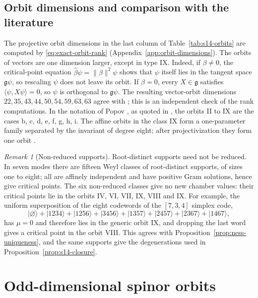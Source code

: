\documentclass{article}
\theoremstyle{definition}
\theoremstyle{remark}
\newtheorem{remark}[theorem]{Remark}
\newcommand{\ket}[1]{\lvert #1\rangle}
\newcommand{\norm}[1]{\lVert #1\rVert}
\begin{document}
\subsection{Orbit dimensions and comparison with the literature}
\label{sec:popov-comparison-integrated}

The projective orbit dimensions in the last column of
Table~\ref{tab:s14-orbits} are computed by \eqref{eq:exact-orbit-rank}
(Appendix~\ref{app:orbit-dimensions}). The orbits of vectors are one dimension
larger, except in type IX. Indeed, if $\beta\ne0$, the critical-point equation
$\widehat\beta\psi=\norm\beta^2\psi$ shows that $\psi$ itself lies in the
tangent space $\mathfrak g\psi$, so rescaling $\psi$ does not leave its orbit.
If $\beta=0$, every $X\in\mathfrak g$ satisfies $\langle\psi,X\psi\rangle=0$,
so $\psi$ is orthogonal to $\mathfrak g\psi$. The resulting vector-orbit
dimensions $22,35,43,44,50,54,59,63,63$ agree with \cite[Table~1]{Gatti_dim13};
this is an independent check of the rank computations. In the notation of
Popov \cite{Popov_dim14RUS}, as quoted in
\cite{BhojaKrasnov2025}, the orbits II to IX are the cases b, c, d, e, f, g, h,
i. The affine orbits in the class IX form a one-parameter family separated by
the invariant of degree eight; after projectivization they form one orbit
\cite[Section~2.1]{Gatti_dim13}.

\begin{remark}[Non-reduced supports]
\label{rem:s14-nonreduced}
Root-distinct supports need not be reduced. In seven modes there are fifteen
Weyl classes of root-distinct supports, of sizes one to eight; all are
affinely independent and have positive Gram solutions, hence give critical
points. The six non-reduced classes give no new chamber values: their
critical points lie in the orbits IV, VI, VII, IX, VIII and IX. For example,
the uniform superposition of the eight codewords of the $[7,3,4]$ simplex
code,
\[
 \ket\varnothing+\ket{1234}+\ket{1256}+\ket{3456}
 +\ket{1357}+\ket{2457}+\ket{2367}+\ket{1467},
\]
has $\mu=0$ and therefore lies in the generic orbit IX, and dropping the last
word gives a critical point in the orbit VIII. This agrees with
Proposition~\ref{prop:ness-uniqueness}, and the same supports give the
degenerations used in Proposition~\ref{prop:s14-closure}.
\end{remark}


\section{Odd-dimensional spinor orbits}
\label{sec:odd-orbits}
\end{document}
